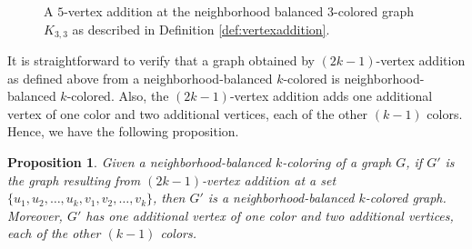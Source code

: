 \documentclass[12pt]{article}
\newtheorem{proposition}[theorem]{Proposition}
\newcommand{\nbc}{neighborhood-balanced $k$-coloring\xspace}
\newcommand{\nbcd}{neighborhood-balanced $k$-colored\xspace}
\begin{document}
\begin{figure}[!htbp]
    \caption{A $5$-vertex addition at the neighborhood balanced $3$-colored graph $K_{3,3}$ as described in Definition \ref{def:vertexaddition}. }
    \label{fig:vertexadd}
\end{figure}
It is straightforward to verify that a graph obtained by $(2k-1)$-vertex addition as defined above from a \nbcd is \nbcd.
Also, the $(2k-1)$-vertex addition adds one additional vertex of one color and two additional vertices, each of the other $(k-1)$ colors.
Hence, we have the following proposition.
\begin{proposition}\label{vertexaddition}
    Given a \nbc of a graph $G$, if $G'$ is the graph resulting from $(2k-1)$-vertex addition at a set $\{u_1,u_2,\dots,u_{k},v_1,v_2,\dots, v_{k}\}$, then $G'$ is a \nbcd graph. Moreover, $G'$ has one additional vertex of one color and two additional vertices, each of the other $(k-1)$ colors.
\end{proposition}
\end{document}
